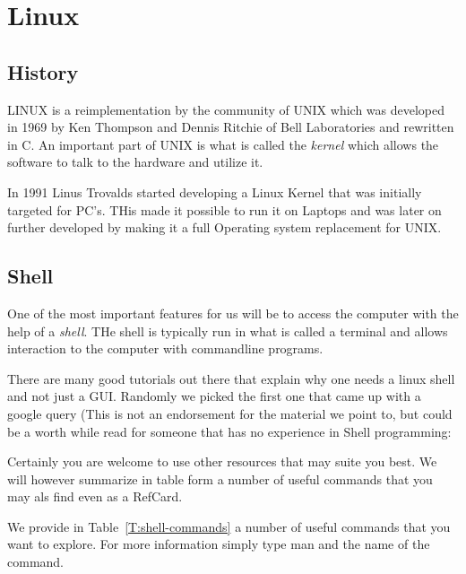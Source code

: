 
\chapter{Linux}
\label{C:linux}

\FILENAME

\section{History}

LINUX is a reimplementation by the community of UNIX which was
developed in 1969 by Ken Thompson and Dennis Ritchie of Bell
Laboratories and rewritten in C. An important part of UNIX is what is
called the \textit{kernel} which allows the software to talk to
the hardware and utilize it. 

In 1991 Linus Trovalds started developing a Linux Kernel that was
initially targeted for PC's. THis made it possible to run it on
Laptops and was later on further developed by making it a full
Operating system replacement for UNIX. 

\section{Shell}

One of the most important features for us will be to access the
computer with the help of a \textit{shell}. THe shell is typically run in
what is called a terminal and allows interaction to the computer with
commandline programs. 

There are many good tutorials out there that explain why one needs a
linux shell and not just a GUI. Randomly we picked the first one that
came up with a google query (This is not an endorsement for the material
we point to, but could be a worth while read for someone that has no
experience in Shell programming:


Certainly you are welcome to use other resources that may suite you
best. We will however summarize in table form a number of useful
commands that you may als find even as a RefCard.


We provide in Table~\ref{T:shell-commands} a number of useful commands
that you want to explore. For more information simply type man and the
name of the command.


